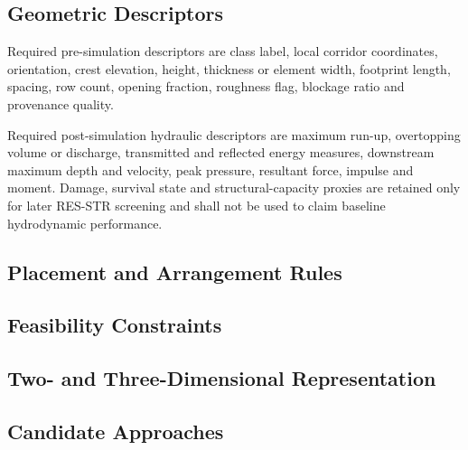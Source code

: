 
\subsection{Geometric Descriptors}
\label{sec:res-geo-met-geometric-descriptors}

Required pre-simulation descriptors are class label, local corridor
coordinates, orientation, crest elevation, height, thickness or
element width, footprint length, spacing, row count, opening fraction,
roughness flag, blockage ratio and provenance quality.

Required post-simulation hydraulic descriptors are maximum run-up,
overtopping volume or discharge, transmitted and reflected energy
measures, downstream maximum depth and velocity, peak pressure,
resultant force, impulse and moment. Damage, survival state and
structural-capacity proxies are retained only for later RES-STR
screening and shall not be used to claim baseline hydrodynamic
performance.

\subsection{Placement and Arrangement Rules}
\label{sec:res-geo-met-placement-arrangement-rules}


\subsection{Feasibility Constraints}
\label{sec:res-geo-met-feasibility-constraints}


\subsection{Two- and Three-Dimensional Representation}
\label{sec:res-geo-met-two-three-dimensional-representation}


\subsection{Candidate Approaches}
\label{sec:res-geo-met-candidate-approaches}

